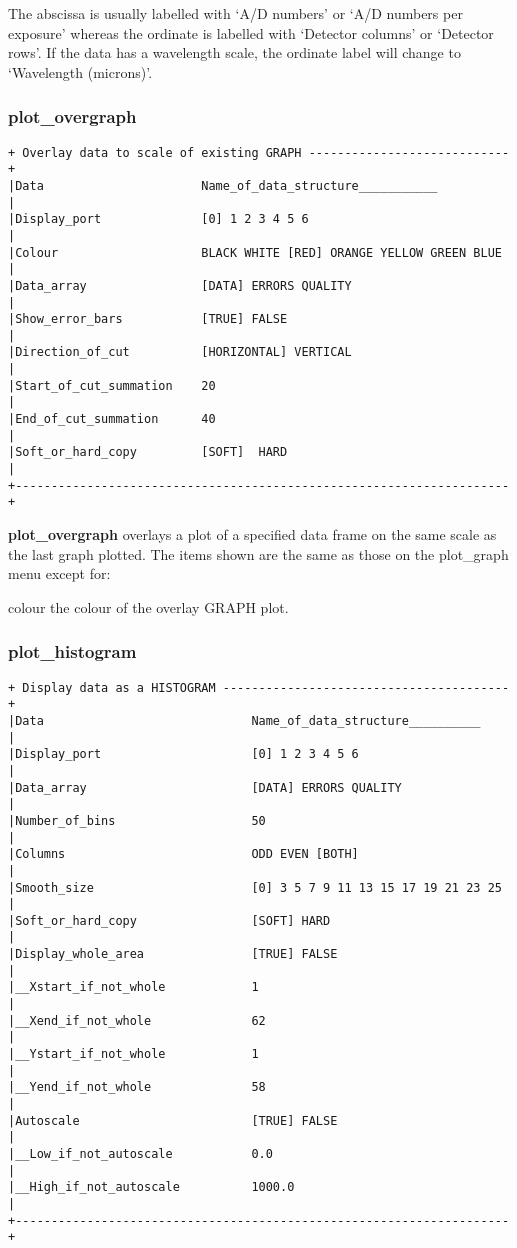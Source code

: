 {The abscissa is usually labelled with `A/D numbers' or `A/D numbers per 
exposure' whereas the ordinate is labelled with `Detector columns' or
`Detector rows'. If the data has a wavelength scale, the ordinate label
will change to `Wavelength (microns)'.

\subsubsection{plot\_overgraph}
\label{plot_overgraph}
\begin{verbatim}
+ Overlay data to scale of existing GRAPH ----------------------------+
|Data                      Name_of_data_structure___________          |
|Display_port              [0] 1 2 3 4 5 6                            |
|Colour                    BLACK WHITE [RED] ORANGE YELLOW GREEN BLUE |
|Data_array                [DATA] ERRORS QUALITY                      |
|Show_error_bars           [TRUE] FALSE                               |
|Direction_of_cut          [HORIZONTAL] VERTICAL                      |
|Start_of_cut_summation    20                                         |
|End_of_cut_summation      40                                         |
|Soft_or_hard_copy         [SOFT]  HARD                               |
+---------------------------------------------------------------------+
\end{verbatim}

{\bf plot\_overgraph} overlays a plot of a specified data frame on
the same scale as the last graph plotted. The items shown are the same 
as those on the {\sf plot\_graph} menu except for:

{\sf colour} the colour of the overlay {\sf GRAPH} plot.

\subsubsection{plot\_histogram}
\label{plot_histogram}
\begin{verbatim}
+ Display data as a HISTOGRAM ----------------------------------------+
|Data                             Name_of_data_structure__________    |
|Display_port                     [0] 1 2 3 4 5 6                     |
|Data_array                       [DATA] ERRORS QUALITY               |
|Number_of_bins                   50                                  |
|Columns                          ODD EVEN [BOTH]                     |
|Smooth_size                      [0] 3 5 7 9 11 13 15 17 19 21 23 25 |
|Soft_or_hard_copy                [SOFT] HARD                         |
|Display_whole_area               [TRUE] FALSE                        |
|__Xstart_if_not_whole            1                                   |
|__Xend_if_not_whole              62                                  |
|__Ystart_if_not_whole            1                                   |
|__Yend_if_not_whole              58                                  |
|Autoscale                        [TRUE] FALSE                        |
|__Low_if_not_autoscale           0.0                                 |
|__High_if_not_autoscale          1000.0                              |
+---------------------------------------------------------------------+
\end{verbatim}

}
